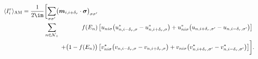 \documentclass[../main.tex]{subfile}
\begin{document}
\begin{equation}
    \begin{aligned}
        \langle I_i^r\rangle_{\text{AM}} = \frac{1}{2\im}\biggl[ \sum_{\sigma\sigma'}\bigl(\bm{m}_{i,i+\delta_r}\cdot\bm{\sigma}\bigr)_{\sigma\sigma'}\\
\sum_{n\in\mathcal{N}_+}~~~~~~~~~~~ f(E_n)                &\left[u_{ni\sigma}       \bigl(u_{n,i-\delta_r,\sigma}^{\ast} - u_{n,i+\delta_r,\sigma}^{\ast}\bigr) + u_{ni\sigma}^{\ast}\bigl(u_{n,i+\delta_r,\sigma'}        - u_{n,i-\delta_r,\sigma'}       \bigr)\right]\\
                         +\bigl(1-f(E_n)\bigr) &\left[v_{ni\sigma}^{\ast}\bigl(v_{n,i-\delta_r,\sigma}        - v_{n,i+\delta_r,\sigma}       \bigr) + v_{ni\sigma}       \bigl(v_{n,i+\delta_r,\sigma'}^{\ast} - v_{n,i-\delta_r,\sigma'}^{\ast}\bigr)\right]\biggr].\\
    \end{aligned}
\end{equation}
\end{document}

